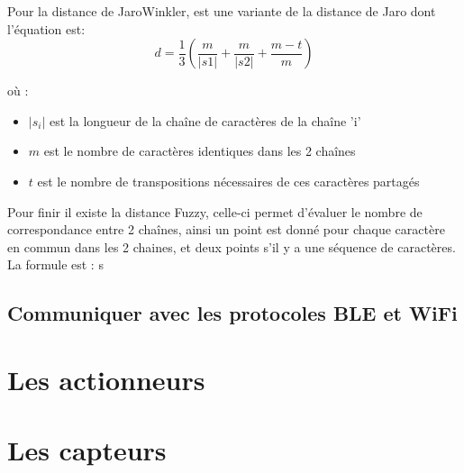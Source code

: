 Pour la distance de JaroWinkler, est une variante de la distance de Jaro dont l'équation est:
\begin{equation}
 d = \frac{1}{3}(\frac{m}{|s1|}+\frac{m}{|s2|}+\frac{m-t}{m})
\end{equation}

où :
\begin{itemize}
 \item $|s_i|$ est la longueur de la chaîne de caractères de la chaîne 'i'
 \item $m$ est le nombre de caractères identiques dans les 2 chaînes
 \item $t$ est le nombre de transpositions nécessaires de ces caractères partagés
\end{itemize}

Pour finir il existe la distance Fuzzy, celle-ci permet d'évaluer le nombre de correspondance entre 2 chaînes, ainsi un point est donné pour chaque caractère en commun dans les 2 chaines, et deux points s'il y a une séquence de caractères. La formule est : 
s


	\subsection{Communiquer avec les protocoles BLE et WiFi}
\section{Les actionneurs}
\section{Les capteurs}


